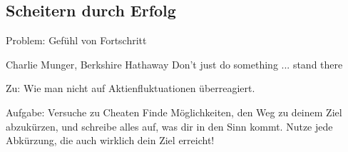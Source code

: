 \subsection{Scheitern durch Erfolg}

\begin{frame}[c]{Problem: Gefühl von Fortschritt}
    \large
    \begin{aquote}{Charlie Munger, Berkshire Hathaway}
        Don’t just do something ... stand there
    \end{aquote}
    \normalsize
    Zu: Wie man nicht auf Aktienfluktuationen überreagiert.
\end{frame}

\begin{frame}[c]
    \begin{block}{Aufgabe: Versuche zu Cheaten}
        Finde Möglichkeiten, den Weg zu deinem Ziel abzukürzen, und schreibe
        alles auf, was dir in den Sinn kommt. Nutze jede Abkürzung, die auch
        wirklich dein Ziel erreicht!
    \end{block}
\end{frame}



%
%
%
%
%
%




